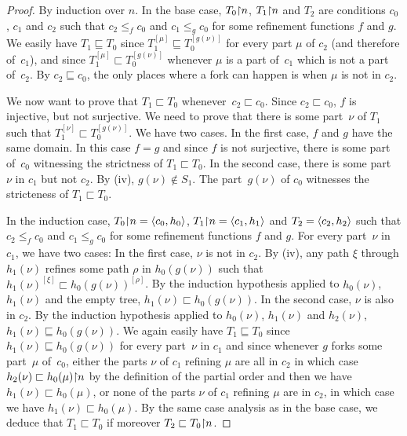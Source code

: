 \begin{proof}
By induction over $n$. In the base case, $T_0 {\upharpoonright} n$, $T_1 {\upharpoonright} n$ and $T_2$
are conditions $c_0$, $c_1$ and $c_2$ such that $c_2 \leq_f c_0$ and $c_1 \leq_g c_0$ for some refinement functions $f$ and $g$.
We easily have $T_1 \sqsubseteq T_0$ since $T_1^{[\mu]} \sqsubseteq T_0^{[g(\nu)]}$ for every
part $\mu$ of $c_2$ (and therefore of~$c_1$),
and since $T_1^{[\mu]} \sqsubset T_0^{[g(\nu)]}$ whenever $\mu$ is a part of~$c_1$ which is not a part of~$c_2$. 
By $c_2 \sqsubseteq c_0$, the only places where a fork can happen is when $\mu$ is not in $c_2$.

We now want to prove that $T_1 \sqsubset T_0$ whenever~$c_2 \sqsubset c_0$.
Since $c_2 \sqsubset c_0$, $f$ is injective, but not surjective. We need to prove that there is some part~$\nu$ of $T_1$ such that $T_1^{[\nu]} \sqsubset T_0^{[g(\nu)]}$. We have two cases. In the first case, $f$ and $g$ have the same domain. In this case $f = g$ and since $f$ is not surjective, 
there is some part of~$c_0$ witnessing the strictness of $T_1 \sqsubset T_0$.
In the second case, there is some part~$\nu$ in $c_1$ but not $c_2$. By (iv), $g(\nu) \not \in S_1$. The part~$g(\nu)$ of $c_0$ witnesses the stricteness of $T_1 \sqsubset T_0$.

In the induction case, $T_0 {\upharpoonright} n = \left\langle c_0, h_0 \right\rangle$, $T_1 {\upharpoonright} n = \left\langle c_1, h_1 \right\rangle$ and $T_2 = \left\langle c_2, h_2 \right\rangle$
such that $c_2 \leq_f c_0$ and $c_1 \leq_g c_0$ for some refinement functions $f$ and $g$.
For every part~$\nu$ in $c_1$, we have two cases:
In the first case, $\nu$ is not in $c_2$. By (iv), any path $\xi$ through $h_1(\nu)$
refines some path $\rho$ in $h_0(g(\nu))$ such that $h_1(\nu)^{[\xi]} \sqsubset h_0(g(\nu))^{[\rho]}$.
By the induction hypothesis applied to $h_0(\nu)$, $h_1(\nu)$ and the empty tree, $h_1(\nu) \sqsubset h_0(g(\nu))$.
In the second case, $\nu$ is also in $c_2$. By the induction hypothesis applied to $h_0(\nu)$, $h_1(\nu)$
and $h_2(\nu)$, $h_1(\nu) \sqsubseteq h_0(g(\nu))$.
We again easily have $T_1 \sqsubseteq T_0$ since $h_1(\nu) \sqsubseteq h_0(g(\nu))$ for every part~$\nu$ in $c_1$
and since whenever $g$ forks some part~$\mu$ of~$c_0$, either the parts $\nu$ of $c_1$ refining $\mu$
are all in $c_2$ in which case $h_2(\nu) \sqsubset h_0(\mu) {\upharpoonright} n$ by the definition of the partial order and then we have $h_1(\nu) \sqsubset h_0(\mu)$, or none of the parts $\nu$ of $c_1$ refining $\mu$ are in $c_2$,
in which case we have $h_1(\nu) \sqsubset h_0(\mu)$.
By the same case analysis as in the base case, we deduce that $T_1 \sqsubset T_0$
if moreover $T_2 \sqsubset T_0 {\upharpoonright} n$.
\end{proof}

